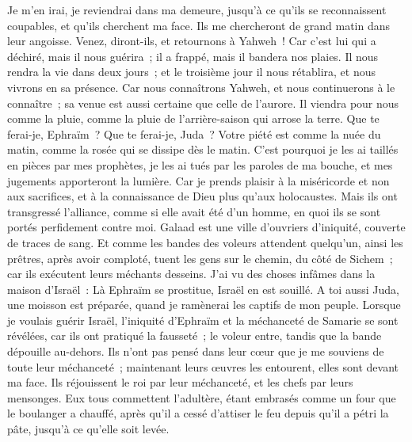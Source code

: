 \begin{multicols}{2}
Je m'en irai, je reviendrai dans ma demeure, jusqu'à ce qu'ils se reconnaissent coupables, et qu'ils cherchent ma face. Ils me chercheront de grand matin dans leur angoisse.
\VerseOne{}Venez, diront-ils, et retournons à Yahweh~! Car c'est lui qui a déchiré, mais il nous guérira~; il a frappé, mais il bandera nos plaies.
Il nous rendra la vie dans deux jours~; et le troisième jour il nous rétablira, et nous vivrons en sa présence.
Car nous connaîtrons Yahweh, et nous continuerons à le connaître~; sa venue est aussi certaine que celle de l'aurore. Il viendra pour nous comme la pluie, comme la pluie de l'arrière-saison qui arrose la terre.
Que te ferai-je, Ephraïm~? Que te ferai-je, Juda~? Votre piété est comme la nuée du matin, comme la rosée qui se dissipe dès le matin.
C'est pourquoi je les ai taillés en pièces par mes prophètes, je les ai tués par les paroles de ma bouche, et mes jugements apporteront la lumière.
Car je prends plaisir à la miséricorde et non aux sacrifices, et à la connaissance de Dieu plus qu'aux holocaustes.
Mais ils ont transgressé l'alliance, comme si elle avait été d'un homme, en quoi ils se sont portés perfidement contre moi.
Galaad est une ville d'ouvriers d'iniquité, couverte de traces de sang.
Et comme les bandes des voleurs attendent quelqu'un, ainsi les prêtres, après avoir comploté, tuent les gens sur le chemin, du côté de Sichem~; car ils exécutent leurs méchants desseins.
J'ai vu des choses infâmes dans la maison d'Israël~: Là Ephraïm se prostitue, Israël en est souillé.
A toi aussi Juda, une moisson est préparée, quand je ramènerai les captifs de mon peuple.
\VerseOne{}Lorsque je voulais guérir Israël, l'iniquité d'Ephraïm et la méchanceté de Samarie se sont révélées, car ils ont pratiqué la fausseté~; le voleur entre, tandis que la bande dépouille au-dehors.
Ils n'ont pas pensé dans leur cœur que je me souviens de toute leur méchanceté~; maintenant leurs œuvres les entourent, elles sont devant ma face.
Ils réjouissent le roi par leur méchanceté, et les chefs par leurs mensonges.
Eux tous commettent l'adultère, étant embrasés comme un four que le boulanger a chauffé, après qu'il a cessé d'attiser le feu depuis qu'il a pétri la pâte, jusqu'à ce qu'elle soit levée.

\end{multicols}

